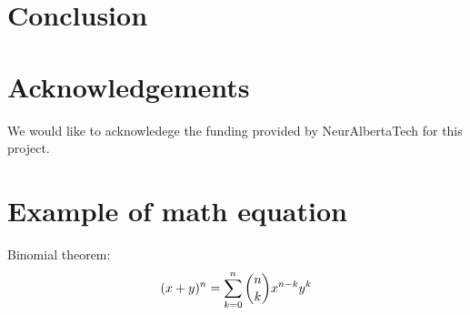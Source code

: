 \documentclass[10pt]{cai}
\begin{document}
\section{Conclusion}


\section*{Acknowledgements}
We would like to acknowledege the funding provided by NeurAlbertaTech for this project.

\appendix

\section{Example of math equation }
Binomial theorem: \cite{hribarUsingDeepQLearning2019}
\begin{equation}
(x+y)^n=\sum_{\substack{k=0}}^{n}\dbinom{n}{k}x^{n-k}y^k
\end{equation}


\printbibliography[heading=subbibintoc]
\end{document}
